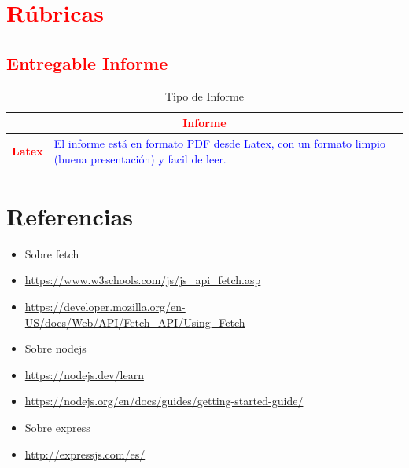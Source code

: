 \documentclass{article}
\begin{document}
\clearpage

	\section{\textcolor{red}{Rúbricas}}
	
	\subsection{\textcolor{red}{Entregable Informe}}
	\begin{table}[H]
		\caption{Tipo de Informe}
		\setlength{\tabcolsep}{0.5em} %
		{\renewcommand{\arraystretch}{1.5}%
		\begin{tabular}{|p{3cm}|p{12cm}|}
			\hline
			\multicolumn{2}{|c|}{\textbf{\textcolor{red}{Informe}}}  \\
			\hline 
			\textbf{\textcolor{red}{Latex}} & \textcolor{blue}{El informe está en formato PDF desde Latex,  con un formato limpio (buena presentación) y facil de leer.}   \\ 
			\hline 
			
			
		\end{tabular}
	}
	\end{table}
	
	\clearpage
	
	
	
\clearpage

\section{Referencias}
\begin{itemize}		
	\item Sobre fetch	
	\item \url{https://www.w3schools.com/js/js_api_fetch.asp}
	\item \url{https://developer.mozilla.org/en-US/docs/Web/API/Fetch_API/Using_Fetch}
	\item Sobre nodejs
	\item \url{https://nodejs.dev/learn}
	\item \url{https://nodejs.org/en/docs/guides/getting-started-guide/}
	\item Sobre express
	\item \url{http://expressjs.com/es/}
\end{itemize}	
	
%
%
%
\end{document}
